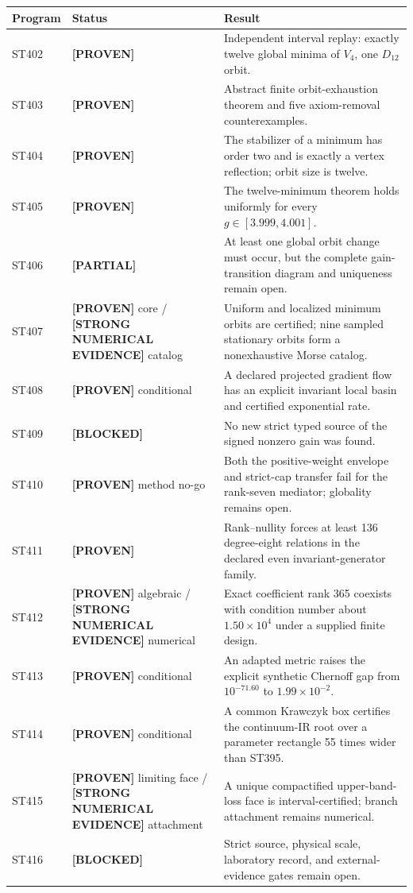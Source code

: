 \documentclass[11pt,a4paper]{article}
\newcommand{\Proven}{\textcolor{green!38!black}{\textbf{[PROVEN]}}}
\newcommand{\Evidence}{\textcolor{orange!80!black}{\textbf{[STRONG NUMERICAL EVIDENCE]}}}
\newcommand{\Partial}{\textcolor{orange!80!black}{\textbf{[PARTIAL]}}}
\newcommand{\Blocked}{\textcolor{red!65!black}{\textbf{[BLOCKED]}}}
\begin{document}
\begin{longtable}{>{\raggedright\arraybackslash}p{}>{\raggedright\arraybackslash}p{}>{\raggedright\arraybackslash}p{}}
\toprule Program&Status&Result\\\midrule\endhead
ST402&\Proven&Independent interval replay: exactly twelve global minima of $V_4$, one $D_{12}$ orbit.\\
ST403&\Proven&Abstract finite orbit-exhaustion theorem and five axiom-removal counterexamples.\\
ST404&\Proven&The stabilizer of a minimum has order two and is exactly a vertex reflection; orbit size is twelve.\\
ST405&\Proven&The twelve-minimum theorem holds uniformly for every $g\in[3.999,4.001]$.\\
ST406&\Partial&At least one global orbit change must occur, but the complete gain-transition diagram and uniqueness remain open.\\
ST407&\Proven{} core / \Evidence{} catalog&Uniform and localized minimum orbits are certified; nine sampled stationary orbits form a nonexhaustive Morse catalog.\\
ST408&\Proven{} conditional&A declared projected gradient flow has an explicit invariant local basin and certified exponential rate.\\
ST409&\Blocked&No new strict typed source of the signed nonzero gain was found.\\
ST410&\Proven{} method no-go&Both the positive-weight envelope and strict-cap transfer fail for the rank-seven mediator; globality remains open.\\
ST411&\Proven&Rank--nullity forces at least 136 degree-eight relations in the declared even invariant-generator family.\\
ST412&\Proven{} algebraic / \Evidence{} numerical&Exact coefficient rank 365 coexists with condition number about $1.50\times10^4$ under a supplied finite design.\\
ST413&\Proven{} conditional&An adapted metric raises the explicit synthetic Chernoff gap from $10^{-71.60}$ to $1.99\times10^{-2}$.\\
ST414&\Proven{} conditional&A common Krawczyk box certifies the continuum-IR root over a parameter rectangle 55 times wider than ST395.\\
ST415&\Proven{} limiting face / \Evidence{} attachment&A unique compactified upper-band-loss face is interval-certified; branch attachment remains numerical.\\
ST416&\Blocked&Strict source, physical scale, laboratory record, and external-evidence gates remain open.\\
\bottomrule
\end{longtable}
\normalsize
\end{document}

